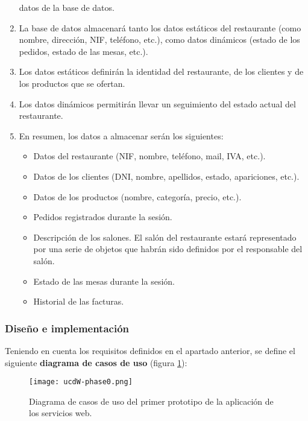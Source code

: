 \begin{enumerate}
datos de la base de datos.
\item La base de datos almacenará tanto los datos estáticos del restaurante 
(como nombre, dirección, NIF, teléfono, etc.), como datos dinámicos (estado de 
los pedidos, estado de las mesas, etc.).
\item Los datos estáticos definirán la identidad del restaurante, de los
clientes y de los productos que se ofertan.
\item Los datos dinámicos permitirán llevar un seguimiento del estado actual
del restaurante.
\item En resumen, los datos a almacenar serán los siguientes:
  \begin{itemize}
  \item Datos del restaurante (NIF, nombre, teléfono, mail, IVA, etc.).
  \item Datos de los clientes (DNI, nombre, apellidos, estado, apariciones,
  etc.).
  \item Datos de los productos (nombre, categoría, precio, etc.).
  \item Pedidos registrados durante la sesión.
  \item Descripción de los salones. El salón del restaurante estará
  representado por una serie de objetos que habrán sido definidos por el
  responsable del salón.
  \item Estado de las mesas durante la sesión.
  \item Historial de las facturas.
  \end{itemize}
\end{enumerate}

\subsubsection{Diseño e implementación}
Teniendo en cuenta los requisitos definidos en el apartado anterior, se define
el siguiente \textbf{diagrama de casos de uso} (figura \ref{fig:ucdW-phase0}):

  \begin{figure}[H]
    \begin{center}
      \texttt{[image: ucdW-phase0.png]}
      \caption{Diagrama de casos de uso del primer prototipo de la aplicación
      de los servicios web.}
      \label{fig:ucdW-phase0}
    \end{center}
  \end{figure}

